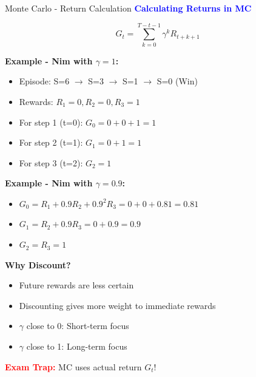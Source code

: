 \documentclass[8pt]{beamer}
\begin{document}
\begin{frame}{Monte Carlo - Return Calculation}
\fontsize{6.5}{7.5}\selectfont
\textcolor{blue}{\textbf{Calculating Returns in MC}}

\[
G_t = \sum_{k=0}^{T-t-1} \gamma^k R_{t+k+1}
\]

\textbf{Example - Nim with $\gamma = 1$:}
\begin{itemize}
\item Episode: S=6 $\rightarrow$ S=3 $\rightarrow$ S=1 $\rightarrow$ S=0 (Win)
\item Rewards: $R_1=0, R_2=0, R_3=1$
\item For step 1 (t=0): $G_0 = 0 + 0 + 1 = 1$
\item For step 2 (t=1): $G_1 = 0 + 1 = 1$
\item For step 3 (t=2): $G_2 = 1$
\end{itemize}

\textbf{Example - Nim with $\gamma = 0.9$:}
\begin{itemize}
\item $G_0 = R_1 + 0.9R_2 + 0.9^2R_3 = 0 + 0 + 0.81 = 0.81$
\item $G_1 = R_2 + 0.9R_3 = 0 + 0.9 = 0.9$
\item $G_2 = R_3 = 1$
\end{itemize}

\textbf{Why Discount?}
\begin{itemize}
\item Future rewards are less certain
\item Discounting gives more weight to immediate rewards
\item $\gamma$ close to 0: Short-term focus
\item $\gamma$ close to 1: Long-term focus
\end{itemize}

\textcolor{red}{\textbf{Exam Trap:}} MC uses actual return $G_t$!
\end{frame}
\end{document}
